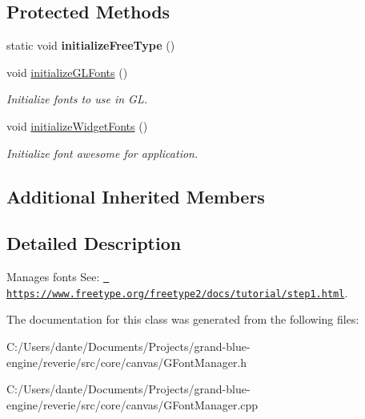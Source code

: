 \subsection*{Protected Methods}
\begin{DoxyCompactItemize}
\item 
\mbox{\label{classrev_1_1_font_manager_a919ca1f4388a574bc4a4c14eece4a163}} 
static void {\bfseries initialize\+Free\+Type} ()
\item 
\mbox{\label{classrev_1_1_font_manager_a06dc9d399372c907e1acd668f7adc778}} 
void \mbox{\hyperlink{classrev_1_1_font_manager_a06dc9d399372c907e1acd668f7adc778}{initialize\+G\+L\+Fonts}} ()
\begin{DoxyCompactList}\small\item\em Initialize fonts to use in GL. \end{DoxyCompactList}\item 
\mbox{\label{classrev_1_1_font_manager_ae584306758b0e69007dc152064368ba0}} 
void \mbox{\hyperlink{classrev_1_1_font_manager_ae584306758b0e69007dc152064368ba0}{initialize\+Widget\+Fonts}} ()
\begin{DoxyCompactList}\small\item\em Initialize font awesome for application. \end{DoxyCompactList}\end{DoxyCompactItemize}
\subsection*{Additional Inherited Members}


\subsection{Detailed Description}
Manages fonts See\+: \href{https://www.freetype.org/freetype2/docs/tutorial/step1.html}{\texttt{ https\+://www.\+freetype.\+org/freetype2/docs/tutorial/step1.\+html}}. 

The documentation for this class was generated from the following files\+:\begin{DoxyCompactItemize}
\item 
C\+:/\+Users/dante/\+Documents/\+Projects/grand-\/blue-\/engine/reverie/src/core/canvas/G\+Font\+Manager.\+h\item 
C\+:/\+Users/dante/\+Documents/\+Projects/grand-\/blue-\/engine/reverie/src/core/canvas/G\+Font\+Manager.\+cpp\end{DoxyCompactItemize}
